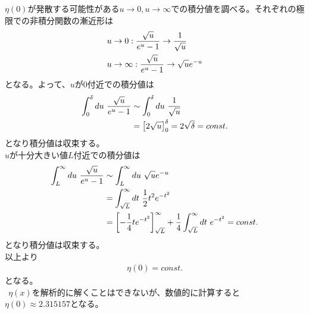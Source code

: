 \documentclass{jsarticle}  %
\numberwithin{equation}{section} %
\numberwithin{figure}{section}
\begin{document}
    $\eta(0)$が発散する可能性がある$u \rightarrow 0,u \rightarrow \infty$での積分値を調べる。それぞれの極限での非積分関数の漸近形は
    \begin{align}
        &u \rightarrow 0: \frac{\sqrt{u}}{e^{u} - 1} \rightarrow \frac{1}{\sqrt{u}} \notag \\
        &u \rightarrow \infty: \frac{\sqrt{u}}{e^{u} - 1} \rightarrow \sqrt{u} e^{-u} \notag
    \end{align}
    となる。よって、$u$が$0$付近での積分値は
    \begin{align}
        \int_0^{\delta} du\ \frac{\sqrt{u}}{e^{u} - 1} &\sim \int_0^{\delta} du\ \frac{1}{\sqrt{u}} \notag \\
        &= \left[ 2\sqrt{u} \right]_0^{\delta} = 2\sqrt{\delta} = const.
    \end{align}
    となり積分値は収束する。\\
    $u$が十分大きい値$L$付近での積分値は
    \begin{align}
        \int_L^{\infty} du\ \frac{\sqrt{u}}{e^{u} - 1} &\sim \int_L^{\infty} du\ \sqrt{u} e^{-u} \notag \\
        &= \int_{\sqrt{L}}^{\infty} dt\ \frac{1}{2} t^2 e^{-t^2} \notag \\
        &= \left[ -\frac{1}{4} t e^{-t^2} \right]_{\sqrt{L}}^{\infty} + \frac{1}{4} \int_{\sqrt{L}}^{\infty} dt\ e^{-t^2} = const.
    \end{align}
    となり積分値は収束する。\\
    以上より
    \begin{align}
        \eta (0) = const.
    \end{align}
    となる。\\
    $\ \ $$\eta (x)$を解析的に解くことはできないが、数値的に計算すると$\eta (0) \approx 2.315157$となる。
\end{document}
